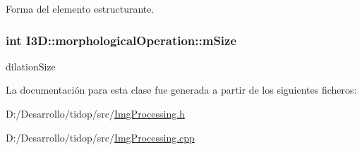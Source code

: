 Forma del elemento estructurante. 

\subsubsection[{\texorpdfstring{m\+Size}{mSize}}]{\setlength{\rightskip}{0pt plus 5cm}int I3\+D\+::morphological\+Operation\+::m\+Size\hspace{0.3cm}{\ttfamily [protected]}}\hypertarget{class_i3_d_1_1morphological_operation_a704f5eda2852dfdb30ef54f92d936e5a}{}\label{class_i3_d_1_1morphological_operation_a704f5eda2852dfdb30ef54f92d936e5a}


dilation\+Size 



La documentación para esta clase fue generada a partir de los siguientes ficheros\+:\begin{DoxyCompactItemize}
\item 
D\+:/\+Desarrollo/tidop/src/\hyperlink{_img_processing_8h}{Img\+Processing.\+h}\item 
D\+:/\+Desarrollo/tidop/src/\hyperlink{_img_processing_8cpp}{Img\+Processing.\+cpp}\end{DoxyCompactItemize}
